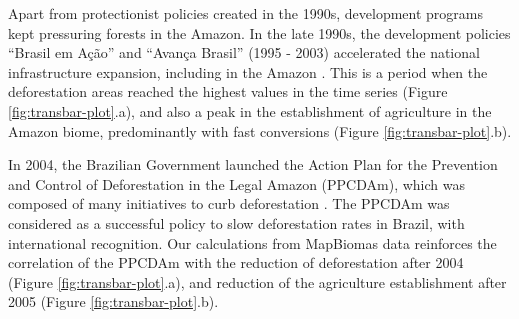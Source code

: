 \documentclass[essd, manuscript]{copernicus}
\begin{document}
Apart from protectionist policies created in the 1990s, development programs kept pressuring forests in the Amazon.
In the late 1990s, the development policies ``Brasil em Ação'' and ``Avança Brasil'' (1995 - 2003) accelerated the national infrastructure expansion, including in the Amazon \citep{Carvalho2002}.
This is a period when the deforestation areas reached the highest values in the time series (Figure \ref{fig:transbar-plot}.a), and also a peak in the establishment of agriculture in the Amazon biome, predominantly with fast conversions (Figure \ref{fig:transbar-plot}.b).

In 2004, the Brazilian Government launched the Action Plan for the Prevention and Control of Deforestation in the Legal Amazon (PPCDAm), which was composed of many initiatives to curb deforestation \citep{West2021}.
The PPCDAm was considered as a successful policy to slow deforestation rates in Brazil, with international recognition.
Our calculations from MapBiomas data reinforces the correlation of the PPCDAm with the reduction of deforestation after 2004 (Figure \ref{fig:transbar-plot}.a), and reduction of the agriculture establishment after 2005 (Figure \ref{fig:transbar-plot}.b).
\end{document}
